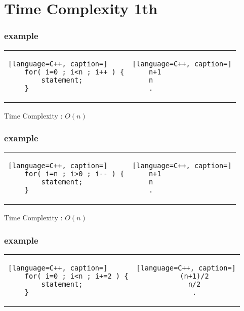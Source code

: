 \documentclass[12pt]{article}
\begin{document}
\section{Time Complexity 1th}


\subsubsection{example}


\begin{center}
  \bgroup
  \def\arraystretch{1.5}%
  \begin{tabular}{ H  G  }
	\begin{lstlisting}[language=C++, caption=]
	for( i=0 ; i<n ; i++ ) {
		statement;
	}
	\end{lstlisting}
     &  
	\begin{lstlisting}[language=C++, caption=]
	n+1
	n
	.
	\end{lstlisting}
  \end{tabular}
  \egroup
\end{center}




Time Complexity : $O(n)$





\subsubsection{example}


\begin{center}
  \bgroup
  \def\arraystretch{1.5}%
  \begin{tabular}{ H  G  }
	\begin{lstlisting}[language=C++, caption=]
	for( i=n ; i>0 ; i-- ) {
		statement;
	}
	\end{lstlisting}
     &  
	\begin{lstlisting}[language=C++, caption=]
	n+1
	n
	.
	\end{lstlisting}
  \end{tabular}
  \egroup
\end{center}




Time Complexity : $O(n)$



\subsubsection{example}


\begin{center}
  \bgroup
  \def\arraystretch{1.5}%
  \begin{tabular}{ H  C  }
	\begin{lstlisting}[language=C++, caption=]
	for( i=0 ; i<n ; i+=2 ) {
		statement;
	}
	\end{lstlisting}
     &  
	\begin{lstlisting}[language=C++, caption=]
	(n+1)/2
	n/2
	.
	\end{lstlisting}
  \end{tabular}
  \egroup
\end{center}
\end{document}
